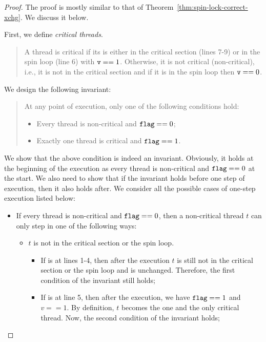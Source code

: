 \documentclass{article}[10pt]
\begin{document}
\begin{proof}
  The proof is mostly similar to that of
  Theorem~\ref{thm:spin-lock-correct-xchg}. We discuss it below.

  First, we define \emph{critical threads}. 
  \begin{quote}
    A thread is critical if its  is either in the critical
    section (lines 7-9) or in the spin loop (line 6) with $\text{\ttfamily v} ==
    1$. Otherwise, it is not critical (non-critical), i.e., it is not in the critical
    section and if it is in the spin loop then $\text{\ttfamily v} == 0$.
  \end{quote}
  We design the following invariant:
  \begin{quote}
    At any point of execution, only one of the following conditions hold:
    \begin{itemize}
    \item Every thread is non-critical and $\text{\ttfamily flag} == 0$;
    \item Exactly one thread is critical and $\text{\ttfamily flag} == 1$.
    \end{itemize}
  \end{quote}
  We show that the above condition is indeed an
  invariant. Obviously, it holds at the beginning of the execution as
  every thread is non-critical and $\text{\ttfamily flag} == 0$ at the start. We also
  need to show that if the invariant holds before one step of
  execution, then it also holds after. We consider all the possible cases
  of one-step execution listed below:
  \begin{itemize}
  \item If every thread is non-critical and $\text{\ttfamily flag} == 0$, then a
    non-critical thread $t$ can only step in one of the following ways:
    \begin{itemize}
    \item $t$ is not in the critical section or the spin loop. 

      \begin{itemize}
      \item If  is at lines 1-4, then after the execution $t$
        is still not in the critical section or the spin loop and
        \kflag is unchanged. Therefore, the first condition of the
        invariant still holds;

      \item If  is at line 5, then after the execution, we
        have $\text{\ttfamily flag} == 1$ and $v == 1$. By definition, $t$ becomes
        the one and the only critical thread. Now, the second
        condition of the invariant holds;


\end{itemize}
\end{itemize}
\end{itemize}
\end{proof}
\end{document}
